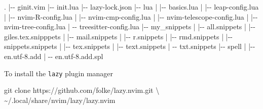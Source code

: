 \documentclass[
  letterpaper,
  DIV=11,
  numbers=noendperiod,
  oneside]{scrartcl}
\newenvironment{Shaded}{\begin{snugshade}}{\end{snugshade}}
\newcommand{\AttributeTok}[1]{\textcolor[rgb]{0.40,0.45,0.13}{#1}}
\newcommand{\BuiltInTok}[1]{\textcolor[rgb]{0.00,0.23,0.31}{#1}}
\newcommand{\DataTypeTok}[1]{\textcolor[rgb]{0.68,0.00,0.00}{#1}}
\newcommand{\ExtensionTok}[1]{\textcolor[rgb]{0.00,0.23,0.31}{#1}}
\newcommand{\FunctionTok}[1]{\textcolor[rgb]{0.28,0.35,0.67}{#1}}
\newcommand{\KeywordTok}[1]{\textcolor[rgb]{0.00,0.23,0.31}{#1}}
\newcommand{\NormalTok}[1]{\textcolor[rgb]{0.00,0.23,0.31}{#1}}
\begin{document}
\begin{Shaded}
\begin{Highlighting}[]
\BuiltInTok{.}
\KeywordTok{|}\ExtensionTok{{-}{-}}\NormalTok{ ginit.vim}
\KeywordTok{|}\ExtensionTok{{-}{-}}\NormalTok{ init.lua}
\KeywordTok{|}\ExtensionTok{{-}{-}}\NormalTok{ lazy{-}lock.json}
\KeywordTok{|}\ExtensionTok{{-}{-}}\NormalTok{ lua}
\KeywordTok{|}   \KeywordTok{|}\ExtensionTok{{-}{-}}\NormalTok{ basics.lua}
\KeywordTok{|}   \KeywordTok{|}\ExtensionTok{{-}{-}}\NormalTok{ leap{-}config.lua}
\KeywordTok{|}   \KeywordTok{|}\ExtensionTok{{-}{-}}\NormalTok{ nvim{-}R{-}config.lua}
\KeywordTok{|}   \KeywordTok{|}\ExtensionTok{{-}{-}}\NormalTok{ nvim{-}cmp{-}config.lua}
\KeywordTok{|}   \KeywordTok{|}\ExtensionTok{{-}{-}}\NormalTok{ nvim{-}telescope{-}config.lua}
\KeywordTok{|}   \KeywordTok{|}\ExtensionTok{{-}{-}}\NormalTok{ nvim{-}tree{-}config.lua}
\KeywordTok{|}   \KeywordTok{\textasciigrave{}}\ExtensionTok{{-}{-}}\NormalTok{ treesitter{-}config.lua}
\KeywordTok{|}\ExtensionTok{{-}{-}}\NormalTok{ my\_snippets}
\KeywordTok{|}   \KeywordTok{|}\ExtensionTok{{-}{-}}\NormalTok{ all.snippets}
\KeywordTok{|}   \KeywordTok{|}\ExtensionTok{{-}{-}}\NormalTok{ giles.tex.snipppets}
\KeywordTok{|}   \KeywordTok{|}\ExtensionTok{{-}{-}}\NormalTok{ mail.snippets}
\KeywordTok{|}   \KeywordTok{|}\ExtensionTok{{-}{-}}\NormalTok{ r.snippets}
\KeywordTok{|}   \KeywordTok{|}\ExtensionTok{{-}{-}}\NormalTok{ rmd.snippets}
\KeywordTok{|}   \KeywordTok{|}\ExtensionTok{{-}{-}}\NormalTok{ snippets.snippets}
\KeywordTok{|}   \KeywordTok{|}\ExtensionTok{{-}{-}}\NormalTok{ tex.snippets}
\KeywordTok{|}   \KeywordTok{|}\ExtensionTok{{-}{-}}\NormalTok{ text.snippets}
\KeywordTok{|}   \KeywordTok{\textasciigrave{}}\AttributeTok{{-}{-}}\NormalTok{ txt.snippets}
\KeywordTok{|}\ExtensionTok{{-}{-}}\NormalTok{ spell}
\KeywordTok{|}   \KeywordTok{|}\ExtensionTok{{-}{-}}\NormalTok{ en.utf{-}8.add}
\KeywordTok{|}   \KeywordTok{\textasciigrave{}}\ExtensionTok{{-}{-}}\NormalTok{ en.utf{-}8.add.spl}
\end{Highlighting}
\end{Shaded}

To install the \texttt{lazy} plugin manager

\begin{Shaded}
\begin{Highlighting}[]
\FunctionTok{git}\NormalTok{ clone https://github.com/folke/lazy.nvim.git }\DataTypeTok{\textbackslash{}}
\NormalTok{   \textasciitilde{}/.local/share/nvim/lazy/lazy.nvim}
\end{Highlighting}
\end{Shaded}
\end{document}
